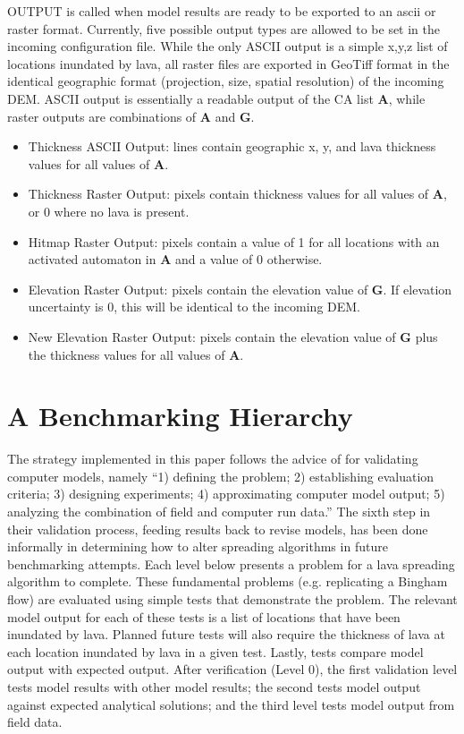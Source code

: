 \documentclass[12pt,letter]{article}
\begin{document}
			OUTPUT is called when model results are ready to be exported to an ascii or raster format. Currently, five possible output types are allowed to be set in the incoming configuration file. While the only ASCII output is a simple x,y,z list of locations inundated by lava, all raster files are exported in GeoTiff format in the identical geographic format (projection, size, spatial resolution) of the incoming DEM. ASCII output is essentially a readable output of the CA list \textbf{A}, while raster outputs are combinations of \textbf{A} and \textbf{G}.
			\begin{itemize}
			\item Thickness ASCII Output: lines contain geographic x, y, and lava thickness values for all values of \textbf{A}.
			\item Thickness Raster Output: pixels contain thickness values for all values of \textbf{A}, or 0 where no lava is present.
			\item Hitmap Raster Output: pixels contain a value of 1 for all locations with an activated automaton in \textbf{A} and a value of 0 otherwise.
			\item Elevation Raster Output: pixels contain the elevation value of \textbf{G}. If elevation uncertainty is 0, this will be identical to the incoming DEM.
			\item New Elevation Raster Output: pixels contain the elevation value of \textbf{G} plus the thickness values for all values of \textbf{A}.
			\end{itemize}
			
			
			

	\section{A Benchmarking Hierarchy}
	
	The strategy implemented in this paper follows the advice of \citet{bayarri2007framework} for validating computer models, namely ``1) defining the problem; 2) establishing evaluation criteria; 3) designing experiments; 4) approximating computer model output; 5) analyzing the combination of field and computer run data.'' The sixth step in their validation process, feeding results back to revise models, has been done informally in determining how to alter spreading algorithms in future benchmarking attempts. Each level below presents a problem for a lava spreading algorithm to complete. These fundamental problems (e.g. replicating a Bingham flow) are evaluated using simple tests that demonstrate the problem. The relevant model output for each of these tests is a list of locations that have been inundated by lava. Planned future tests will also require the thickness of lava at each location inundated by lava in a given test. Lastly, tests compare model output with expected output. After verification (Level 0), the first validation level tests model results with other model results; the second tests model output against expected analytical solutions; and the third level tests model output from field data.
\end{document}
